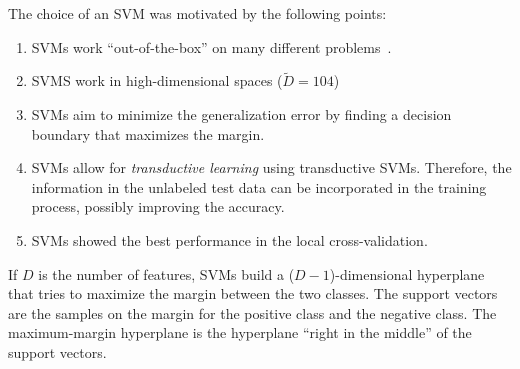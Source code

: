 \documentclass[a4paper,11pt]{article}
\begin{document}
The choice of an SVM was motivated by the following points:

\begin{enumerate}
\item SVMs work ``out-of-the-box'' on many different problems~\cite{russell2003artificial}.
\item SVMS work in high-dimensional spaces ($\tilde{D} = 104$)
\item SVMs aim to minimize the generalization error by finding a
  decision boundary that maximizes the margin.
\item SVMs allow for \emph{transductive learning} using transductive
  SVMs. Therefore, the information in the unlabeled test data can be
  incorporated in the training process, possibly improving the
  accuracy.
\item SVMs showed the best performance in the local cross-validation.
\end{enumerate}

If $D$ is the number of features, SVMs build a ($D-1$)-dimensional
hyperplane that tries to maximize the margin between the two
classes. The support vectors are the samples on the margin for the
positive class and the negative class. The maximum-margin hyperplane
is the hyperplane ``right in the middle'' of the support vectors.
\end{document}
